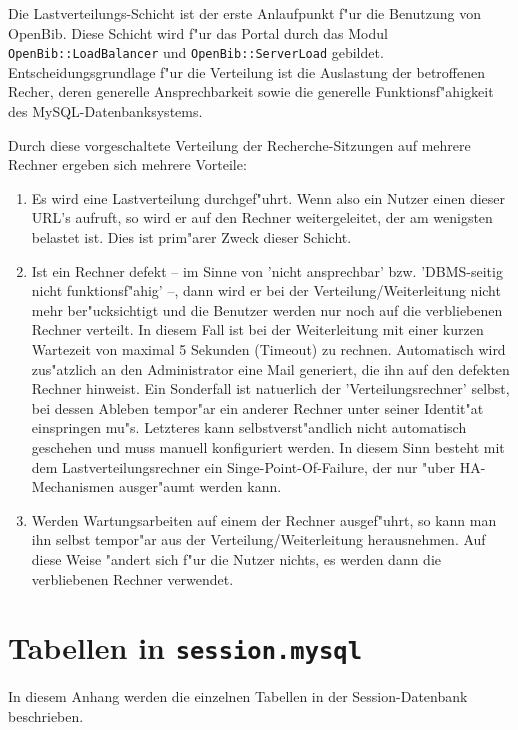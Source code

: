\documentclass[11pt, twoside, a4paper, BCOR8mm, DIV12, bibtotoc,idxtotoc]{scrbook}
\begin{document}
\begin{itemize}
Die Lastverteilungs-Schicht ist der erste Anlaufpunkt f"ur die
Benutzung von OpenBib. Diese Schicht wird f"ur das Portal durch das
Modul \texttt{OpenBib::LoadBalancer} und \texttt{OpenBib::ServerLoad} gebildet.
Entscheidungsgrundlage f"ur die Verteilung ist die Auslastung der
betroffenen Recher, deren generelle Ansprechbarkeit sowie die
generelle Funktionsf"ahigkeit des MySQL-Datenbanksystems.

Durch diese vorgeschaltete Verteilung der Recherche-Sitzungen auf
mehrere Rechner ergeben sich mehrere Vorteile:

\begin{enumerate}
\item Es wird eine Lastverteilung durchgef"uhrt. Wenn also ein Nutzer
  einen dieser URL's aufruft, so wird er auf den Rechner
  weitergeleitet, der am wenigsten belastet ist.  Dies ist prim"arer
  Zweck dieser Schicht.
\item Ist ein Rechner defekt -- im Sinne von 'nicht ansprechbar'
  bzw. 'DBMS-seitig nicht funktionsf"ahig' --, dann wird er bei der
  Verteilung/Weiterleitung nicht mehr ber"ucksichtigt und die Benutzer
  werden nur noch auf die verbliebenen Rechner verteilt. In diesem
  Fall ist bei der Weiterleitung mit einer kurzen Wartezeit von
  maximal 5 Sekunden (Timeout) zu rechnen.  Automatisch wird
  zus"atzlich an den Administrator eine Mail ge\-ne\-riert, die ihn
  auf den defekten Rechner hinweist. Ein Sonderfall ist natuerlich der
  'Verteilungs\-rech\-ner' selbst, bei dessen Ableben tempor"ar ein
  anderer Rechner unter seiner Identit"at einspringen mu"s. Letzteres
  kann selbstverst"andlich nicht automatisch geschehen und muss
  manuell konfiguriert werden. In diesem Sinn besteht mit dem
  Lastverteilungsrechner ein Singe-Point-Of-Failure, der nur "uber
  HA-Mechanismen ausger"aumt werden kann.
\item Werden Wartungsarbeiten auf einem der Rechner ausgef"uhrt, so
  kann man ihn selbst tempor"ar aus der Verteilung/Weiterleitung
  herausnehmen. Auf diese Weise "andert sich f"ur die Nutzer nichts,
  es werden dann die verbliebenen Rechner verwendet.
\end{enumerate}

\appendix

\chapter{Tabellen in \texttt{session.mysql}}

In diesem Anhang werden die einzelnen Tabellen in der
Session-Datenbank beschrieben.


\end{itemize}
\end{document}
